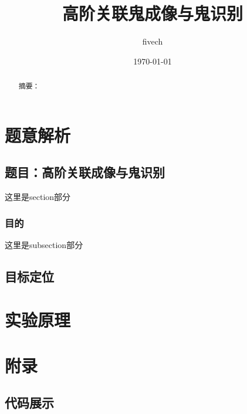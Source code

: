 \documentclass{report}
\title{高阶关联鬼成像与鬼识别}
\author{fivech}
\date{\today}
\begin{document}
\maketitle
\begin{abstract}
摘要：
\end{abstract}

\tableofcontents
\chapter{题意解析}
\section{题目：高阶关联成像与鬼识别}
这里是section部分
\subsection{目的}
这里是subsection部分

\section{目标定位}

\chapter{实验原理}

\chapter{附录}
\section{代码展示}
\end{document}
